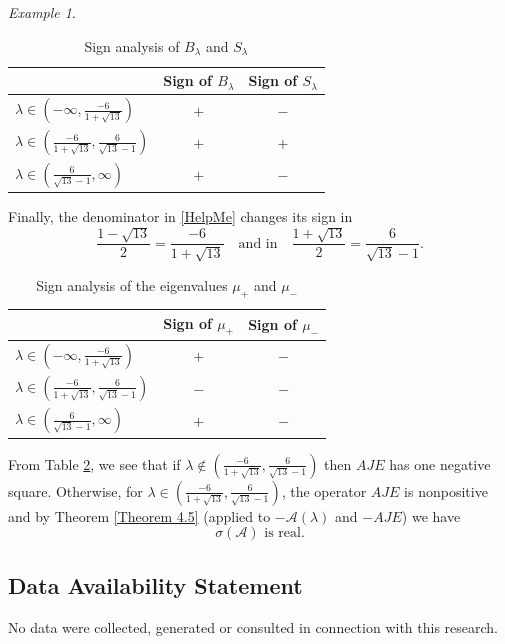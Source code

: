 \documentclass{birkjour}
\theoremstyle{definition}
\theoremstyle{remark}
\newtheorem*{ex}{Example}
\numberwithin{equation}{section}
\newcommand{\A}{\mathcal A}
\begin{document}
\begin{ex}
\begin{table}[ht]
\centering
\renewcommand{\arraystretch}{1.4} %
\caption{Sign analysis of $B_\lambda$ and $S_\lambda$}
\begin{tabular}{lcc}
\hline
  & \textbf{Sign of $B_\lambda$} & \textbf{Sign of $S_\lambda$} \\
\hline
 $\lambda \in \left(-\infty,\frac{-6}{1+\sqrt{13}}\right)$ & $+$ & $-$ \\[1ex]
  $\lambda \in \left(\frac{-6}{1+\sqrt{13}},
 \frac{6}{\sqrt{13}-1}\right) $ & $+$ & $+$ \\[1ex]
 $\lambda \in\left(\frac{6}{\sqrt{13}-1},\infty\right)$ & $+$ & $-$ \\
\hline
\end{tabular} 
\label{tab:sign-A-B}
\end{table}
Finally, the denominator in  \eqref{HelpMe} changes its sign in 
$$
\frac{1-\sqrt{13}}{2} = \frac{-6}{1+\sqrt{13}} \quad \mbox{and in}\quad  
\frac{1+\sqrt{13}}{2} = \frac{6}{\sqrt{13}-1}.
$$

\begin{table}[H]
\centering
\renewcommand{\arraystretch}{1.4}
\caption{Sign analysis of the eigenvalues $\mu_+$ and $\mu_-$ } \vspace{2mm}
\begin{tabular}{lcc}
\hline
 & \textbf{Sign of $\mu_+$} & \textbf{Sign of $\mu_-$} \\
\hline
 $\lambda \in \left(-\infty,\frac{-6}{1+\sqrt{13}}\right)$  & $+$ & $-$ \\[1ex]
$\lambda \in \left(\frac{-6}{1+\sqrt{13}},
 \frac{6}{\sqrt{13}-1}\right) $   & $-$ & $-$ \\[1ex]
$\lambda \in\left(\frac{6}{\sqrt{13}-1},\infty\right)$  
& $+$ & $-$  \\
\hline
\end{tabular}
\label{tab:sign-L}
\end{table}

From  Table \ref{tab:sign-L}, we see that if $\lambda \notin \left(\frac{-6}{1+\sqrt{13}},
 \frac{6}{\sqrt{13}-1}\right)$ then $AJE$ has one negative square. Otherwise, for $\lambda \in \left(\frac{-6}{1+\sqrt{13}},
 \frac{6}{\sqrt{13}-1}\right)$, the operator $AJE$ is nonpositive and by Theorem \ref{Theorem 4.5} (applied to 
 $-\A(\lambda)$ and $-AJE$) we have
 $$
 \sigma(\A) \mbox{ is real.}
 $$
\end{ex}

\subsection*{Data Availability Statement}
 No data were collected, generated or consulted
in connection with this research.
\end{document}
